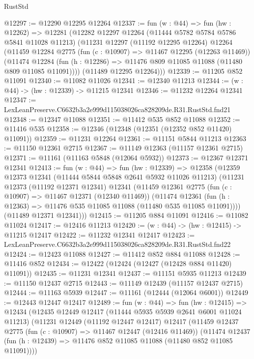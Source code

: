 \begin{lexlean}{RustStd}
\begin{coremodule}
@12297 := @12290 @12295 @12264
@12337 := fun (w : @44) =>
  fun (hw : @12262) =>
  @12281
    (@12282
      @12297
      @12264
      (@11444 @5782 @5784 @5786 @5841 @11028 @11213)
      (@11231
        @12297
        (@11192 @12295 @12264)
        @12264
        (@11459
          @12284
          @2775
          (fun (c : @10907) => @11467 @12295 (@12263 @11469))
          (@11474
            @12284
            (fun (h : @12286) => @11476 @809 @11085 @11088 (@11480 @809 @11085 @11091))))
        (@11489 @12295 @12264)))
@12339 := @11205 @852 @11091
@12340 := @11082 @11026
@12341 := @12340 @11213
@12344 := (w : @44) -> (hw : @12339) -> @11215 @12341
@12346 := @11232 @12264 @12341
@12347 := LexLeanPreserve.C6632b3a2e999d115038026ca828209de.R31.RustStd.fnd21
@12348 := @12347 @11088
@12351 := @11412 @535 @852 @11088
@12352 := @11416 @535
@12358 := @12346 (@12348 (@12351 (@12352 @852 @11420) @11091))
@12359 := @11231 @12264
@12361 := @11151 @5844 @11213
@12363 := @11150 @12361 @2715
@12367 := @11149 @12363 (@11157 @12361 @2715)
@12371 := @11161 (@11163 @5848 (@12064 @5932))
@12373 := @12367 @12371 @12341
@12413 := fun (w : @44) =>
  fun (hw : @12339) =>
  @12358
    (@12359
      @12373
      @12341
      (@11444 @5844 @5848 @2641 @5932 @11026 @11213)
      (@11231
        @12373
        (@11192 @12371 @12341)
        @12341
        (@11459
          @12361
          @2775
          (fun (c : @10907) => @11467 @12371 (@12340 @11469))
          (@11474
            @12361
            (fun (h : @12363) => @11476 @535 @11085 @11088 (@11480 @535 @11085 @11091))))
        (@11489 @12371 @12341)))
@12415 := @11205 @884 @11091
@12416 := @11082 @11024
@12417 := @12416 @11213
@12420 := (w : @44) -> (hw : @12415) -> @11215 @12417
@12422 := @11232 @12341 @12417
@12423 := LexLeanPreserve.C6632b3a2e999d115038026ca828209de.R31.RustStd.fnd22
@12424 := @12423 @11088
@12427 := @11412 @852 @884 @11088
@12428 := @11416 @852
@12434 := @12422 (@12424 (@12427 (@12428 @884 @11420) @11091))
@12435 := @11231 @12341
@12437 := @11151 @5935 @11213
@12439 := @11150 @12437 @2715
@12443 := @11149 @12439 (@11157 @12437 @2715)
@12444 := @11163 @5939
@12447 := @11161 (@12444 (@12064 @6001))
@12449 := @12443 @12447 @12417
@12489 := fun (w : @44) =>
  fun (hw : @12415) =>
  @12434
    (@12435
      @12449
      @12417
      (@11444 @5935 @5939 @2641 @6001 @11024 @11213)
      (@11231
        @12449
        (@11192 @12447 @12417)
        @12417
        (@11459
          @12437
          @2775
          (fun (c : @10907) => @11467 @12447 (@12416 @11469))
          (@11474
            @12437
            (fun (h : @12439) => @11476 @852 @11085 @11088 (@11480 @852 @11085 @11091))))

\end{coremodule}
\end{lexlean}
